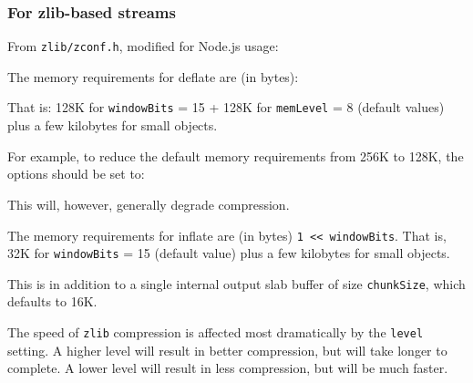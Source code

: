 \subsubsection{For zlib-based streams}\label{for-zlib-based-streams}

From \texttt{zlib/zconf.h}, modified for Node.js usage:

The memory requirements for deflate are (in bytes):

\begin{Shaded}
\begin{Highlighting}[]
\NormalTok{(} \OperatorTok{\textless{}\textless{}}\OperatorTok{+} \NormalTok{)) }\OperatorTok{+}\NormalTok{ (} \OperatorTok{\textless{}\textless{}}\OperatorTok{+} \NormalTok{))}
\end{Highlighting}
\end{Shaded}

That is: 128K for \texttt{windowBits} = 15 + 128K for \texttt{memLevel}
= 8 (default values) plus a few kilobytes for small objects.

For example, to reduce the default memory requirements from 256K to
128K, the options should be set to:

\begin{Shaded}
\begin{Highlighting}[]
\OperatorTok{=}\NormalTok{ \{ }\OperatorTok{:} \OperatorTok{,} \OperatorTok{:} \NormalTok{ \}}\OperatorTok{;}
\end{Highlighting}
\end{Shaded}

This will, however, generally degrade compression.

The memory requirements for inflate are (in bytes)
\texttt{1\ \textless{}\textless{}\ windowBits}. That is, 32K for
\texttt{windowBits} = 15 (default value) plus a few kilobytes for small
objects.

This is in addition to a single internal output slab buffer of size
\texttt{chunkSize}, which defaults to 16K.

The speed of \texttt{zlib} compression is affected most dramatically by
the \texttt{level} setting. A higher level will result in better
compression, but will take longer to complete. A lower level will result
in less compression, but will be much faster.

